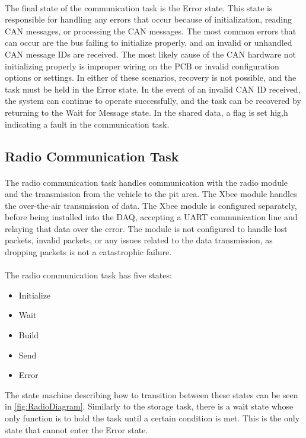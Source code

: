 \paragraph{}
The final state of the communication task is the Error state.
This state is responsible for handling any errors that occur because of initialization, reading CAN messages, or processing the CAN messages.
The most common errors that can occur are the bus failing to initialize properly, and an invalid or unhandled CAN message IDs are received.
The most likely cause of the CAN hardware not initializing properly is improper wiring on the PCB or invalid configuration options or settings.
In either of these scenarios, recovery is not possible, and the task must be held in the Error state.
In the event of an invalid CAN ID received, the system can continue to operate successfully, and the task can be recovered by returning to the Wait for Message state.
In the shared data, a flag is set hig,h indicating a fault in the communication task.

\subsection{Radio Communication Task}

\paragraph{}
The radio communication task handles communication with the radio module and the transmission from the vehicle to the pit area.
The Xbee module handles the over-the-air transmission of data.
The Xbee module is configured separately, before being installed into the DAQ, accepting a UART communication line and relaying that data over the error.
The module is not configured to handle lost packets, invalid packets, or any issues related to the data transmission, as dropping packets is not a catastrophic failure.

\paragraph{}
The radio communication task has five states:
\begin{itemize}
	\item Initialize
	\item Wait
	\item Build
	\item Send
	\item Error
\end{itemize}
The state machine describing how to transition between these states can be seen in \cref{fig:RadioDiagram}.
Similarly to the storage task, there is a wait state whose only function is to hold the task until a certain condition is met.
This is the only state that cannot enter the Error state.

